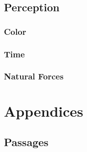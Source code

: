 \documentclass[openany, 12pt, b5paper, draft]{memoir}
\begin{document}
\chapter{Perception}
\section{Color}
\section{Time}
\section{Natural Forces}

\part{Appendices}
\appendix

\chapter{Passages}
\backmatter
\end{document}
